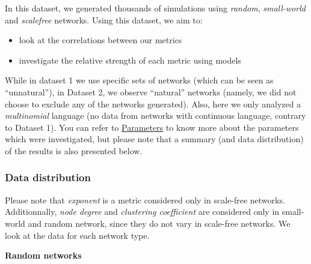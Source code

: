 \documentclass[
]{article}
\providecommand{\tightlist}{%
  \setlength{\itemsep}{0pt}\setlength{\parskip}{0pt}}
\begin{document}
In this dataset, we generated thousands of simulations using
\emph{random}, \emph{small-world} and \emph{scalefree} networks. Using
this dataset, we aim to:

\begin{itemize}
\tightlist
\item
  look at the correlations between our metrics
\item
  investigate the relative strength of each metric using models
\end{itemize}

While in dataset 1 we use specific sets of networks (which can be seen
as ``unnatural''), in Dataset 2, we observe ``natural'' networks
(namely, we did not choose to exclude any of the networks generated).
Also, here we only analyzed a \emph{multinomial} language (no data from
networks with continuous language, contrary to Dataset 1). You can refer
to \protect\hyperlink{parameters}{Parameters} to know more about the
parameters which were investigated, but please note that a summary (and
data distribution) of the results is also presented below.

\hypertarget{data-distribution}{%
\subsubsection{Data distribution}\label{data-distribution}}

Please note that \emph{exponent} is a metric considered only in
scale-free networks. Additionnally, \emph{node degree} and
\emph{clustering coefficient} are considered only in small-world and
random network, since they do not vary in scale-free networks. We look
at the data for each network type.

\textbf{Random networks}
\end{document}
